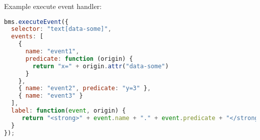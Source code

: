 %

Example execute event handler:

\begin{lstlisting}[language=JavaScript]
bms.executeEvent({
  selector: "text[data-some]",
  events: [
    { 
      name: "event1", 
      predicate: function (origin) {
        return "x=" + origin.attr("data-some") 
      }
    },
    { name: "event2", predicate: "y=3" },
    { name: "event3" } 
  ],
  label: function(event, origin) {
     return "<strong>" + event.name + "." + event.predicate + "</strong>";
  }
});
\end{lstlisting}
